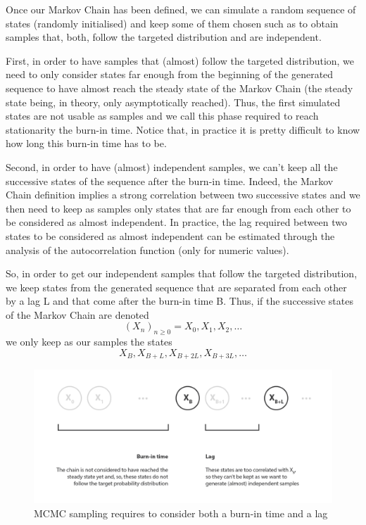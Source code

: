 Once our Markov Chain has been defined, we can simulate a random sequence of states (randomly initialised) and keep some of them chosen such as to obtain samples that, both, follow the targeted distribution and are independent.

First, in order to have samples that (almost) follow the targeted distribution, we need to only consider states far enough from the beginning of the generated sequence to have almost reach the steady state of the Markov Chain (the steady state being, in theory, only asymptotically reached). Thus, the first simulated states are not usable as samples and we call this phase required to reach stationarity the burn-in time. Notice that, in practice it is pretty difficult to know how long this burn-in time has to be.

Second, in order to have (almost) independent samples, we can't keep all the successive states of the sequence after the burn-in time. Indeed, the Markov Chain definition implies a strong correlation between two successive states and we then need to keep as samples only states that are far enough from each other to be considered as almost independent. In practice, the lag required between two states to be considered as almost independent can be estimated through the analysis of the autocorrelation function (only for numeric values).

So, in order to get our independent samples that follow the targeted distribution, we keep states from the generated sequence that are separated from each other by a lag L and that come after the burn-in time B. Thus, if the successive states of the Markov Chain are denoted
\begin{equation}\left(X_{n}\right)_{n \geq 0}=X_{0}, X_{1}, X_{2}, \dots\end{equation}
we only keep as our samples the states
\begin{equation}X_{B}, X_{B+L}, X_{B+2 L}, X_{B+3 L}, \dots\end{equation}

\begin{figure}[h]
    \centering
\includegraphics[width=\textwidth]{pic/p05c07-snip05.png}
    \caption{MCMC sampling requires to consider both a burn-in time and a lag}
    \label{fig:p05c07-snip05}
\end{figure}


